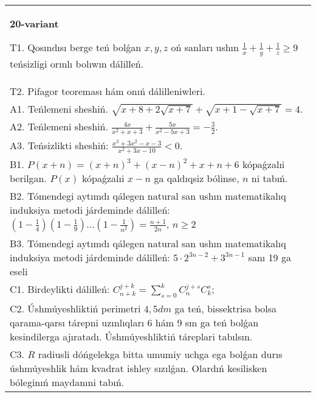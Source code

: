 \documentclass{article}
\begin{document}
\begin{tabular}{m{17cm}}
\textbf{20-variant}
\newline

T1. Qosındısı berge teń bolǵan \(x,y,z\) oń sanları ushın \(\frac{1}{x} + \frac{1}{y} + \frac{1}{z} \geq 9\) teńsizligi orınlı bolıwın dálilleń. \\
T2. Pifagor teoreması hám onıń dálilleniwleri. \\
A1. Teńlemeni sheshiń. \(\sqrt{x + 8 + 2\sqrt{x + 7}} + \sqrt{x + 1 - \sqrt{x + 7}} = 4\). \\
A2. Teńlemeni sheshiń. \(\frac{4x}{x^{2} + x + 3} + \frac{5x}{x^{2} - 5x + 3} = - \frac{3}{2}\). \\
A3. Teńsizlikti sheshiń: \(\frac{x^{3} + 3x^{2} - x - 3}{x^{2} + 3x - 10} < 0\). \\
B1. \(P(x + n) = (x + n)^{3} + (x - n)^{2} + x + n + 6\) kópaǵzalıi berilgan. \(P(x)\) kópaǵzalıi \(x - n\) ga qaldıqsiz bólinse, \(n\) ni tabıń. \\
B2. Tómendegi aytımdı qálegen natural san ushın matematikalıq induksiya metodi járdeminde dálilleń: \(\left( 1 - \frac{1}{4} \right)\left( 1 - \frac{1}{9} \right)...\left( 1 - \frac{1}{n^{2}} \right) = \frac{n + 1}{2n}\), \(n \geq 2\) \\
B3. Tómendegi aytımdı qálegen natural san ushın matematikalıq induksiya metodi járdeminde dálilleń: \(5 \cdot 2^{3n - 2} + 3^{3n - 1}\) sanı 19 ga eseli \\
C1. Birdeylikti dálilleń: \(C_{n + k}^{j + k} = \sum_{s = 0}^{k}C_{n}^{j + s}C_{k}^{s}\); \\
C2. Úshmúyeshliktiń perimetri \(4,5dm\) ga teń, bissektrisa bolsa qarama-qarsı tárepni uzınlıqları 6 hám 9 sm ga teń bolǵan kesindilerga ajıratadı. Úshmúyeshliktiń táreplari tabılsın. \\
C3. \(R\) radiusli dóńgelekga bitta umumiy uchga ega bolǵan durıs úshmúyeshlik hám kvadrat ishley sızılǵan. Olardıń kesilisken bóleginıń maydanıni tabıń. \\

\end{tabular}
\vspace{1cm}
\end{document}
